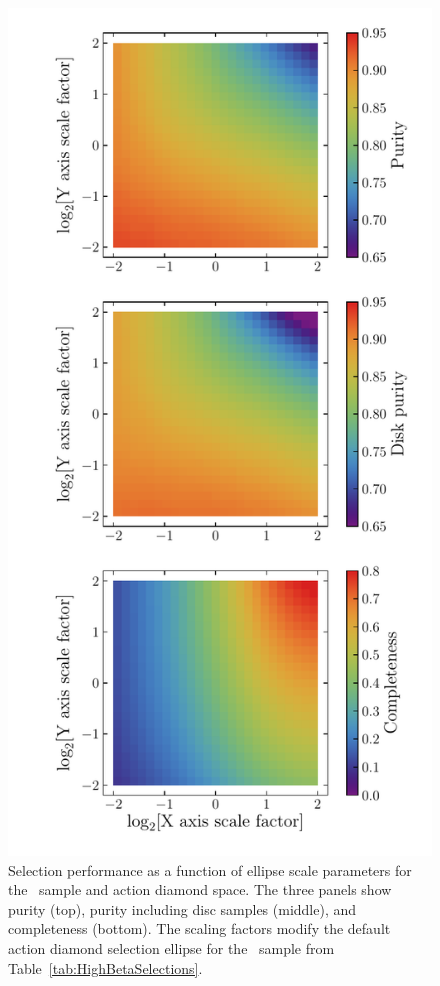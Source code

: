 \begin{figure}
    \centering
    \includegraphics[width=\halftextwidth]{figure/ch2/SurveyADCompletenessPurity.pdf}
    \caption{Selection performance as a function of ellipse scale parameters for the \survey\ sample and action diamond space. The three panels show purity (top), purity including disc samples (middle), and completeness (bottom). The scaling factors modify the default action diamond selection ellipse for the \survey\ sample from Table~\ref{tab:HighBetaSelections}.}
    \label{fig:SurveyADCompletenessPurity}
\end{figure}


